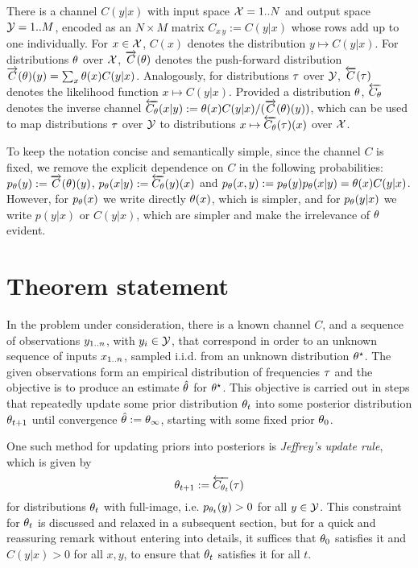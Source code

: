 \documentclass{article}
\begin{document}
There is a channel $C(y|x)$ with input space ${\mathcal{X}}=1..N$ and output space ${\mathcal{Y}}=1..M$, encoded as an $N\times M$ matrix $C_{x\,y}:=C(y|x)$ whose rows add up to one individually.
For $x\in {\mathcal{X}}$, $C(x)$ denotes the distribution $y\mapsto C(y|x)$.
For distributions ${\theta}$ over ${\mathcal{X}}$, $\overrightarrow{C}({\theta})$ denotes the push-forward distribution $\overrightarrow{C}({\theta})(y) = \sum_x {\theta}(x) C(y|x)$.
Analogously, for distributions ${\tau}$ over ${\mathcal{Y}}$, $\Cbwd[](\py)$ denotes the likelihood function $x\mapsto C(y|x)$.
Provided a distribution ${\theta}$, $\Cbwd[\px]$ denotes the inverse channel $\Cbwd[\px](x|y) := \px(x) C(y|x) / (\Cfwd(\px)(y))$, which can be used to map distributions ${\tau}$ over ${\mathcal{Y}}$ to distributions $x\mapsto\Cbwd[\px](\py)(x)$ over ${\mathcal{X}}$.

To keep the notation concise and semantically simple, since the channel $C$ is fixed, we remove the explicit dependence on $C$ in the following probabilities: ${p_{\theta}}(y) := \overrightarrow{C}({\theta})(y)$, $\ppx(x|y) := \Cbwd(y)(x)$ and ${p_{\theta}}(x,y) := {p_{\theta}}(y) {p_{\theta}}(x|y) = {\theta}(x) C(y|x)$.
However, for ${p_{\theta}}(x)$ we write directly ${\theta}(x)$, which is simpler, and for ${p_{\theta}}(y|x)$ we write $p(y|x)$ or $C(y|x)$, which are simpler and make the irrelevance of ${\theta}$ evident.

\section{Theorem statement}

In the problem under consideration, there is a known channel $C$, and a sequence of observations ${y_{1..n}}$, with $y_i\in{\mathcal{Y}}$, that correspond in order to an unknown sequence of inputs ${x_{1..n}}$, sampled i.i.d. from an unknown distribution ${\theta}^\star$.
The given observations form an empirical distribution of frequencies ${\tau}$ and the objective is to produce an estimate $\hat{{\theta}}$ for ${\theta}^\star$.
This objective is carried out in steps that repeatedly update some prior distribution ${{\theta}_t}$ into some posterior distribution ${\theta}_{t+1}$ until convergence $\hat{{\theta}}:={\theta}_{\infty}$, starting with some fixed prior ${\theta}_0$.

One such method for updating priors into posteriors is \textit{Jeffrey's update rule}, which is given by
\begin{equation}\label{eq:jeffreys-rule}
    \pxtt := \Cbwd[\pxt](\py)
\end{equation}
for distributions ${{\theta}_t}$ with full-image, i.e. ${p_{{{\theta}_t}}}(y)>0$ for all $y\in {\mathcal{Y}}$.
This constraint for ${{\theta}_t}$ is discussed and relaxed in a subsequent section, but for a quick and reassuring remark without entering into details, it suffices that ${\theta}_0$ satisfies it and $C(y|x)>0$ for all $x,y$, to ensure that ${\theta}_t$ satisfies it for all $t$.
\end{document}
